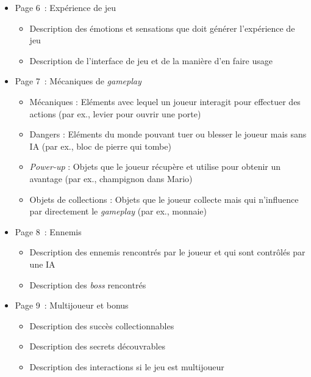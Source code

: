 \addtocounter{table}{-1}

\begin{table}[H]
\footnotesize
\begin{framed}
\begin{itemize}
    \item Page 6~: Expérience de jeu
    \begin{itemize}
        \item Description des émotions et sensations que doit générer l'expérience de jeu
        \item Description de l'interface de jeu et de la manière d'en faire usage


    \end{itemize}
    \item Page 7~:  Mécaniques de \emph{gameplay}
    \begin{itemize}
        \item Mécaniques : Eléments avec lequel un joueur interagit pour effectuer des actions (par ex., levier pour ouvrir une porte)
        \item Dangers : Eléments du monde pouvant tuer ou blesser le joueur mais sans IA (par ex., bloc de pierre qui tombe)
        \item \emph{Power-up} : Objets que le joueur récupère et utilise pour obtenir un avantage (par ex., champignon dans Mario)
        \item Objets de collections : Objets que le joueur collecte mais qui n'influence par directement le \emph{gameplay} (par ex.,  monnaie)
    \end{itemize}
    \item Page 8~: Ennemis
    \begin{itemize}
        \item Description des ennemis rencontrés par le joueur et qui sont contrôlés par une IA
        \item Description des \emph{boss} rencontrés
    \end{itemize}
    \item Page 9~: Multijoueur et bonus
    \begin{itemize}
        \item Description des succès collectionnables
        \item Description des secrets découvrables
        \item Description des interactions si le jeu est multijoueur
    \end{itemize}

\end{itemize}
\end{framed}
\end{table}
